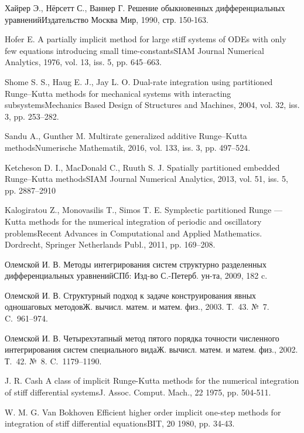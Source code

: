 \documentclass[a4paper,article,14pt]{extarticle}
\begin{document}
\begin{thebibliography}{1}
 Хайрер Э., Нёрсетт С., Ваннер Г. \flqq Решение обыкновенных дифференциальных уравнений\frqq Издательство Москва Мир, 1990, стр. 150-163.

 Hofer E. \flqq A partially implicit method for large stiff systems of ODEs with only few equations
introducing small time-constants\frqq SIAM Journal Numerical Analytics, 1976, vol. 13, iss. 5, pp. 645–663.

 Shome S. S., Haug E. J., Jay L. O. \flqq Dual-rate integration using partitioned Runge--Kutta methods for mechanical systems with interacting subsystems\frqq Mechanics Based Design of Structures and Machines, 2004, vol. 32, iss. 3, pp. 253–282.

 Sandu A., Gunther M. \flqq Multirate generalized additive Runge--Kutta methods\frqq Numerische Mathematik, 2016, vol. 133, iss. 3, pp. 497--524.

 Ketcheson D. I., MacDonald C., Ruuth S. J. \flqq Spatially partitioned embedded Runge--Kutta methods\frqq SIAM Journal Numerical Analytics, 2013, vol. 51, iss. 5, pp. 2887–2910

 Kalogiratou Z., Monovasilis T., Simos T. E. \flqq Symplectic partitioned Runge — Kutta methods for the numerical integration of periodic and oscillatory problems\frqq Recent Advances in Computational and
Applied Mathematics. Dordrecht, Springer Netherlands Publ., 2011, pp. 169–208.

 Олемской И. В. \flqq Методы интегрирования систем структурно разделенных дифференциальных уравнений\frqq СПб: Изд-во С.-Петерб. ун-та, 2009, 182 c.

  Олемской И. В. \flqq Структурный подход к задаче конструирования явных одношаговых методов\frqq Ж. вычисл. матем. и матем. физ., 2003. Т.~43. №~7. C.~961--974.

 Олемской И. В. \flqq Четырехэтапный метод пятого порядка точности численного интегрирования систем специального вида\frqq Ж. вычисл. матем. и матем. физ., 2002. Т.~42. №~8. C.~1179--1190.

 J. R. Cash \flqq A class of implicit Runge-Kutta methods for the numerical integration of stiff differential systems\frqq J. Assoc. Comput. Mach., 22 1975, pp. 504-511.

 W. M. G. Van Bokhoven \flqq Efficient higher order implicit one-step methods for integration of stiff differential equations\frqq BIT, 20 1980, pp. 34-43.


\end{thebibliography}
\end{document}
